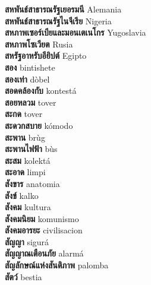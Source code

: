 \textbf{ สหพันธ์สาธารณรัฐเยอรมนี  } Alemania \\
\textbf{ สหพันธ์สาธารณรัฐไนจีเรีย  } Nigeria \\
\textbf{ สหภาพเซอร์เบียและมอนเตเนโกร  } Yugoslavia \\
\textbf{ สหภาพโซเวียต  } Rusia \\
\textbf{ สหรัฐอาหรับอียิปต์  } Egipto \\
\textbf{ สอง  } bintishete \\
\textbf{ สองเท่า  } dòbel \\
\textbf{ สอดคล้องกับ  } kontestá \\
\textbf{ สอยหลวม  } tover \\
\textbf{ สะกด  } tover \\
\textbf{ สะดวกสบาย  } kómodo \\
\textbf{ สะพาน  } brùg \\
\textbf{ สะพานไฟฟ้า  } bùs \\
\textbf{ สะสม  } kolektá \\
\textbf{ สะอาด  } limpi \\
\textbf{ สังขาร  } anatomia \\
\textbf{ สังข์  } kalko \\
\textbf{ สังคม  } kultura \\
\textbf{ สังคมนิยม  } komunismo \\
\textbf{ สังคมอารยะ  } civilisacion \\
\textbf{ สัญญา  } sigurá \\
\textbf{ สัญญาณเตือนภัย  } alarmá \\
\textbf{ สัญลักษณ์แห่งสันติภาพ  } palomba \\
\textbf{ สัตว์  } bestia \\

